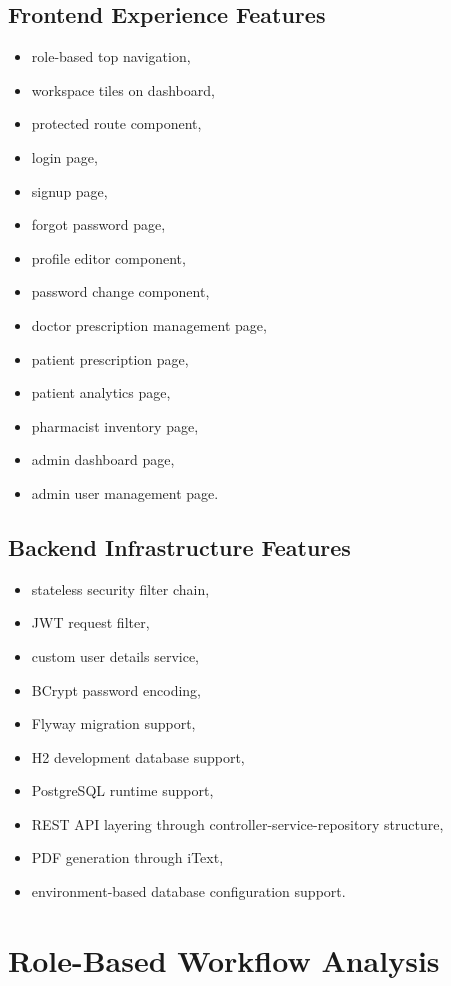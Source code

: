 \documentclass[12pt,a4paper]{article}
\begin{document}
\subsection{Frontend Experience Features}
\begin{itemize}[leftmargin=*]
  \item role-based top navigation,
  \item workspace tiles on dashboard,
  \item protected route component,
  \item login page,
  \item signup page,
  \item forgot password page,
  \item profile editor component,
  \item password change component,
  \item doctor prescription management page,
  \item patient prescription page,
  \item patient analytics page,
  \item pharmacist inventory page,
  \item admin dashboard page,
  \item admin user management page.
\end{itemize}

\subsection{Backend Infrastructure Features}
\begin{itemize}[leftmargin=*]
  \item stateless security filter chain,
  \item JWT request filter,
  \item custom user details service,
  \item BCrypt password encoding,
  \item Flyway migration support,
  \item H2 development database support,
  \item PostgreSQL runtime support,
  \item REST API layering through controller-service-repository structure,
  \item PDF generation through iText,
  \item environment-based database configuration support.
\end{itemize}

\section{Role-Based Workflow Analysis}
\end{document}
